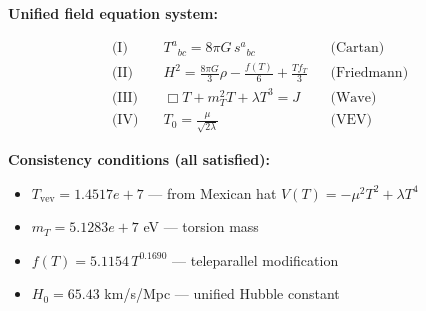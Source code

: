 
\textbf{Unified field equation system:}

\begin{align}
  \text{(I)} \quad & T^a{}_{bc} = 8\pi G \, s^a{}_{bc} && \text{(Cartan)} \\
  \text{(II)} \quad & H^2 = \frac{8\pi G}{3}\rho - \frac{f(T)}{6} + \frac{Tf_T}{3} && \text{(Friedmann)} \\
  \text{(III)} \quad & \Box T + m_T^2 T + \lambda T^3 = J && \text{(Wave)} \\
  \text{(IV)} \quad & T_0 = \frac{\mu}{\sqrt{2\lambda}} && \text{(VEV)}
\end{align}

\textbf{Consistency conditions (all satisfied):}
\begin{itemize}
  \item $T_{\text{vev}} = 1.4517e+7$ — from Mexican hat $V(T) = -\mu^2 T^2 + \lambda T^4$
  \item $m_T = 5.1283e+7$ eV — torsion mass
  \item $f(T) = 5.1154 \, T^{0.1690}$ — teleparallel modification
  \item $H_0 = 65.43$ km/s/Mpc — unified Hubble constant
\end{itemize}